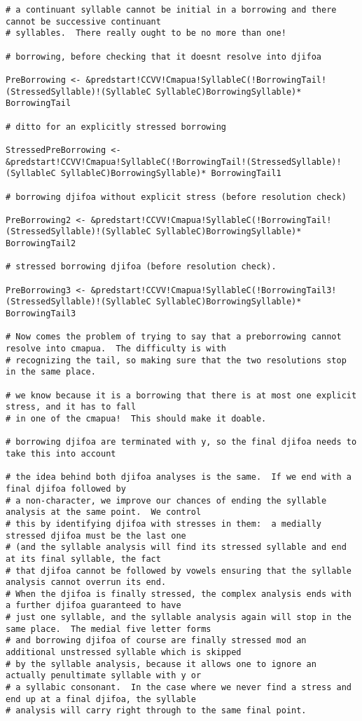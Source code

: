 \documentclass{article}
\begin{document}
\begin{verbatim}
# a continuant syllable cannot be initial in a borrowing and there cannot be successive continuant
# syllables.  There really ought to be no more than one!

# borrowing, before checking that it doesnt resolve into djifoa

PreBorrowing <- &predstart!CCVV!Cmapua!SyllableC(!BorrowingTail!(StressedSyllable)!(SyllableC SyllableC)BorrowingSyllable)* BorrowingTail

# ditto for an explicitly stressed borrowing

StressedPreBorrowing <- &predstart!CCVV!Cmapua!SyllableC(!BorrowingTail!(StressedSyllable)!(SyllableC SyllableC)BorrowingSyllable)* BorrowingTail1

# borrowing djifoa without explicit stress (before resolution check)

PreBorrowing2 <- &predstart!CCVV!Cmapua!SyllableC(!BorrowingTail!(StressedSyllable)!(SyllableC SyllableC)BorrowingSyllable)* BorrowingTail2

# stressed borrowing djifoa (before resolution check).

PreBorrowing3 <- &predstart!CCVV!Cmapua!SyllableC(!BorrowingTail3!(StressedSyllable)!(SyllableC SyllableC)BorrowingSyllable)* BorrowingTail3

# Now comes the problem of trying to say that a preborrowing cannot resolve into cmapua.  The difficulty is with
# recognizing the tail, so making sure that the two resolutions stop in the same place.

# we know because it is a borrowing that there is at most one explicit stress, and it has to fall
# in one of the cmapua!  This should make it doable.

# borrowing djifoa are terminated with y, so the final djifoa needs to take this into account

# the idea behind both djifoa analyses is the same.  If we end with a final djifoa followed by
# a non-character, we improve our chances of ending the syllable analysis at the same point.  We control
# this by identifying djifoa with stresses in them:  a medially stressed djifoa must be the last one
# (and the syllable analysis will find its stressed syllable and end at its final syllable, the fact
# that djifoa cannot be followed by vowels ensuring that the syllable analysis cannot overrun its end.
# When the djifoa is finally stressed, the complex analysis ends with a further djifoa guaranteed to have
# just one syllable, and the syllable analysis again will stop in the same place.  The medial five letter forms
# and borrowing djifoa of course are finally stressed mod an additional unstressed syllable which is skipped
# by the syllable analysis, because it allows one to ignore an actually penultimate syllable with y or 
# a syllabic consonant.  In the case where we never find a stress and end up at a final djifoa, the syllable
# analysis will carry right through to the same final point.


\end{verbatim}
\end{document}
